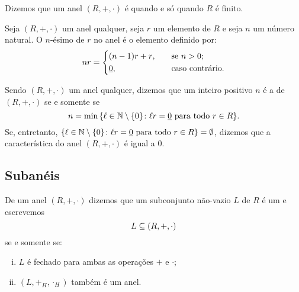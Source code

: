 \begin{Nom}
  Dizemos que um anel $(R,+,\cdot)$ é 
  quando
  e só quando $R$ é finito.
\end{Nom}

\begin{Not}
  Seja $(R,+,\cdot)$ um anel qualquer, seja $r$ um elemento de $R$ e
  seja $n$ um número natural.
  O $n$-ésimo  de
  $r$ no anel é o elemento definido por:
  \begin{equation*}
    \simb[$n$-ésimo múltiplo de $r$]{nr} = \left\{
    \begin{aligned}
      &(n-1)r+r\MMv&\quad&\text{se $n>0$;}\\
      &\zero\MMv&\quad&\text{caso contrário.}
    \end{aligned}
    \right.
  \end{equation*}
\end{Not}

\begin{Def}
  Sendo $(R,+,\cdot)$ um anel qualquer, dizemos que um inteiro positivo
  $n$ é a  de
  $(R,+,\cdot)$ se e somente se
  \begin{equation*}
    n = \min{\cjpp{\ell\in\MMN\setminus{\cj{0}}}%
      {\ell r = \zero\text{ para todo }r\in R}}\MMp
  \end{equation*}
  Se, entretanto, $\cjpp{\ell\in\MMN\setminus{\cj{0}}}%
      {\ell r = \zero\text{ para todo }r\in R}=\emptyset$, dizemos que a
      característica do anel $(R,+,\cdot)$ é igual a $0$.
\end{Def}

\subsection{Subanéis}

\begin{Def}
  De um anel $(R,+,\cdot)$ dizemos que um subconjunto
  não-vazio $L$ de $R$ é
  um
   e escrevemos
  \begin{equation*}
    \simb[propriedade de subanel de $L$ em relação a
    $(R,+,\cdot)$]{L\subseteq (R,+,\cdot)}
  \end{equation*}
  se e somente se:
  \begin{enumerate}[(i)]
    \item $L$ é fechado para ambas as operações $+$ e $\cdot$;
    \item $(L,+_H,\cdot_H)$ também é um anel.
  \end{enumerate}
\end{Def}

